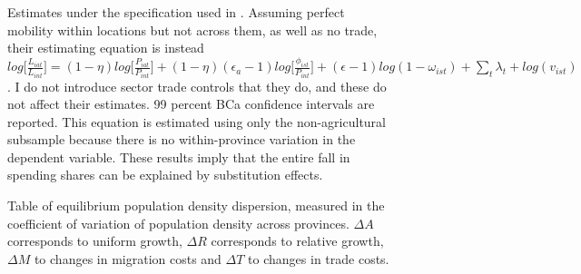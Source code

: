 \documentclass[]{article}
\theoremstyle{plain}
\begin{document}
\begin{figure}


	\caption{Estimates under the specification used in \cite{cominetal2021}. Assuming perfect mobility within locations but not across them, as well as no trade, their estimating equation is instead $log\bigg[\frac{L_{iat}}{L_{int}}\bigg] =  (1-\eta)log\bigg[\frac{P_{iat}}{P_{int}}\bigg] +  (1-\eta)(\epsilon_{a} - 1)log\bigg[\frac{\phi_{ist}}{P_{int}}\bigg] + (\epsilon - 1)log(1-\omega_{ist}) + \sum_{t}\lambda_{t} + log(v_{ist})$. I do not introduce sector trade controls that they do, and these do not affect their estimates. 99 percent BCa confidence intervals are reported. This equation is estimated using only the non-agricultural subsample because there is no within-province variation in the dependent variable. These results imply that the entire fall in spending shares can be explained by substitution effects.}
	\label{fig:cominestimate}
\end{figure}


\begin{figure}
	\caption{Table of equilibrium population density dispersion, measured in the coefficient of variation of population density across provinces. $\Delta A$ corresponds to uniform growth, $\Delta R$ corresponds to relative growth, $\Delta M$ to changes in migration costs and $\Delta T$ to changes in trade costs.}
	\label{fig:marginaleffects}
\end{figure}
\end{document}

